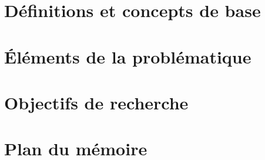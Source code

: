 \label{sec:Introduction}  %

\section{Définitions et concepts de base}  %

\section{Éléments de la problématique}  %

\section{Objectifs de recherche}  %

\section{Plan du mémoire}  %
